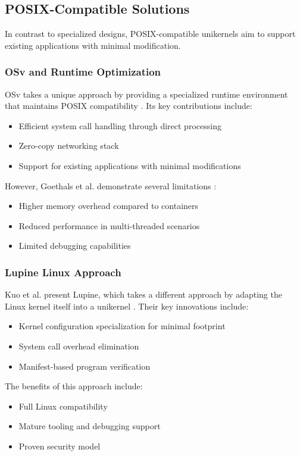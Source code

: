 \documentclass[conference]{IEEEtran}
\begin{document}
\subsection{POSIX-Compatible Solutions}
In contrast to specialized designs, POSIX-compatible unikernels aim to support existing applications with minimal modification.

\subsubsection{OSv and Runtime Optimization}
OSv takes a unique approach by providing a specialized runtime environment that maintains POSIX compatibility \cite{unikernels_vs_containers}. Its key contributions include:
\begin{itemize}
	\item Efficient system call handling through direct processing
	\item Zero-copy networking stack
	\item Support for existing applications with minimal modifications
\end{itemize}

However, Goethals et al. demonstrate several limitations \cite{unikernels_vs_containers}:
\begin{itemize}
	\item Higher memory overhead compared to containers
	\item Reduced performance in multi-threaded scenarios
	\item Limited debugging capabilities
\end{itemize}

\subsubsection{Lupine Linux Approach}
Kuo et al. present Lupine, which takes a different approach by adapting the Linux kernel itself into a unikernel \cite{linux_kernel_clothing}. Their key innovations include:
\begin{itemize}
	\item Kernel configuration specialization for minimal footprint
	\item System call overhead elimination
	\item Manifest-based program verification
\end{itemize}

The benefits of this approach include:
\begin{itemize}
	\item Full Linux compatibility
	\item Mature tooling and debugging support
	\item Proven security model
\end{itemize}
\end{document}
